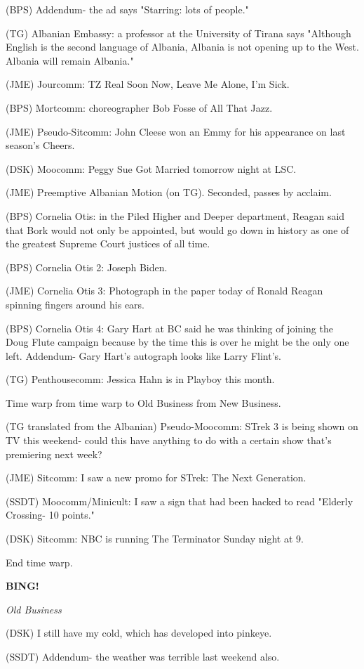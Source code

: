 \documentclass[12pt]{article}
\newcommand{\bing}{{\bf BING!} }
\newcommand{\goto}[1]{\bing \vskip 12pt \centerline{{\em{#1}}}}
\begin{document}
(BPS) Addendum- the ad says "Starring: lots of people."

(TG) Albanian Embassy: a professor at the University of Tirana says "Although English is the second language of Albania, Albania is not opening up to the West. Albania will remain Albania."

(JME) Jourcomm: TZ Real Soon Now, Leave Me Alone, I'm Sick.

(BPS) Mortcomm: choreographer Bob Fosse of All That Jazz.

(JME) Pseudo-Sitcomm: John Cleese won an Emmy for his appearance on last season's Cheers.

(DSK) Moocomm: Peggy Sue Got Married tomorrow night at LSC.

(JME) Preemptive Albanian Motion (on TG). Seconded, passes by acclaim.

(BPS) Cornelia Otis: in the Piled Higher and Deeper department, Reagan said that Bork would not only be appointed, but would go down in history as one of the greatest Supreme Court justices of all time.

(BPS) Cornelia Otis 2: Joseph Biden.

(JME) Cornelia Otis 3: Photograph in the paper today of Ronald Reagan spinning fingers around his ears.

(BPS) Cornelia Otis 4: Gary Hart at BC said he was thinking of joining the Doug Flute campaign because by the time this is over he might be the only one left. Addendum- Gary Hart's autograph looks like Larry Flint's.

(TG) Penthousecomm: Jessica Hahn is in Playboy this month.

Time warp from time warp to Old Business from New Business.

(TG translated from the Albanian) Pseudo-Moocomm: STrek 3 is being shown on TV this weekend- could this have anything to do with a certain show that's premiering next week?

(JME) Sitcomm: I saw a new promo for STrek: The Next Generation.

(SSDT) Moocomm/Minicult: I saw a sign that had been hacked to read "Elderly Crossing- 10 points."

(DSK) Sitcomm: NBC is running The Terminator Sunday night at 9.

End time warp.

\goto{Old Business}

(DSK) I still have my cold, which has developed into pinkeye.

(SSDT) Addendum- the weather was terrible last weekend also.
\end{document}
